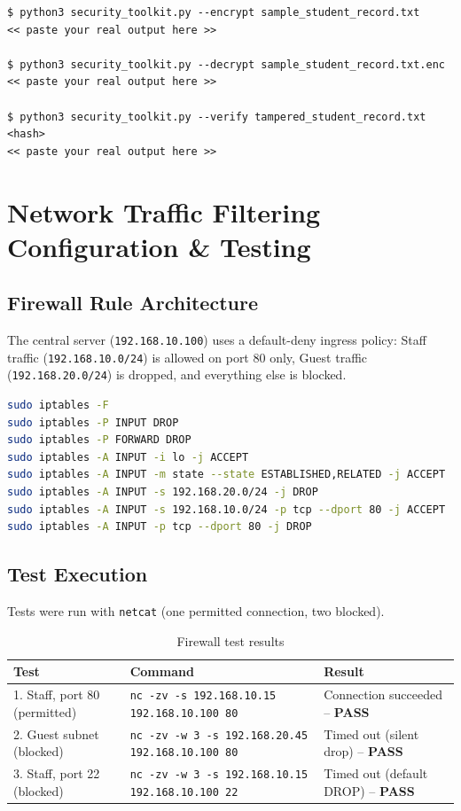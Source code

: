 \documentclass[11pt,a4paper]{article}
\begin{document}
\begin{lstlisting}
$ python3 security_toolkit.py --encrypt sample_student_record.txt
<< paste your real output here >>

$ python3 security_toolkit.py --decrypt sample_student_record.txt.enc
<< paste your real output here >>

$ python3 security_toolkit.py --verify tampered_student_record.txt <hash>
<< paste your real output here >>
\end{lstlisting}

\section{Network Traffic Filtering Configuration \& Testing}

\subsection{Firewall Rule Architecture}
The central server (\texttt{192.168.10.100}) uses a default-deny ingress
policy: Staff traffic (\texttt{192.168.10.0/24}) is allowed on port 80 only,
Guest traffic (\texttt{192.168.20.0/24}) is dropped, and everything else is blocked.

\begin{lstlisting}[language=bash]
sudo iptables -F
sudo iptables -P INPUT DROP
sudo iptables -P FORWARD DROP
sudo iptables -A INPUT -i lo -j ACCEPT
sudo iptables -A INPUT -m state --state ESTABLISHED,RELATED -j ACCEPT
sudo iptables -A INPUT -s 192.168.20.0/24 -j DROP
sudo iptables -A INPUT -s 192.168.10.0/24 -p tcp --dport 80 -j ACCEPT
sudo iptables -A INPUT -p tcp --dport 80 -j DROP
\end{lstlisting}

\subsection{Test Execution}
Tests were run with \texttt{netcat} (one permitted connection, two blocked).

\begin{table}[h!]
  \centering
  \small
  \begin{tabular}{@{}p{3.2cm}p{5.6cm}p{5.2cm}@{}}
    \toprule
    \textbf{Test} & \textbf{Command} & \textbf{Result} \\
    \midrule
    1. Staff, port 80 (permitted) &
      \texttt{nc -zv -s 192.168.10.15 192.168.10.100 80} &
      Connection succeeded -- \textbf{PASS} \\
    2. Guest subnet (blocked) &
      \texttt{nc -zv -w 3 -s 192.168.20.45 192.168.10.100 80} &
      Timed out (silent drop) -- \textbf{PASS} \\
    3. Staff, port 22 (blocked) &
      \texttt{nc -zv -w 3 -s 192.168.10.15 192.168.10.100 22} &
      Timed out (default DROP) -- \textbf{PASS} \\
    \bottomrule
  \end{tabular}
  \caption{Firewall test results}
\end{table}
\end{document}
